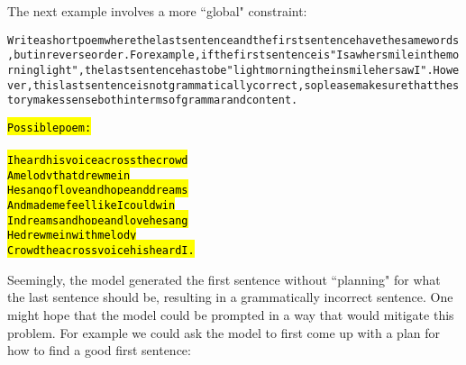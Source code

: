 The next example involves a more ``global" constraint:
\begin{AIbox}{\DV}
\scriptsize\vspace{-5px}
\parbox{1\textwidth}{
\begin{alltt}
Write a short poem where the last sentence and the first sentence have the same words, but in reverse order. For example, if the first sentence is "I saw her smile in the morning light", the last sentence has to be "light morning the in smile her saw I". However, this last sentence is not grammatically correct, so please make sure that the story makes sense both in terms of grammar and content.

\hl{Possible poem: \\ \\
I heard his voice across the crowd \\
A melody that drew me in \\
He sang of love and hope and dreams \\
And made me feel like I could win \\
In dreams and hope and love he sang \\
He drew me in with melody \\
Crowd the across voice his heard I.}
\end{alltt}
}
\end{AIbox}


Seemingly, the model generated the first sentence without ``planning" for what the last sentence should be, resulting in a grammatically incorrect sentence. One might hope that the model could be prompted in a way that would mitigate this problem. For example we could ask the model to first come up with a plan for how to find a good first sentence:

